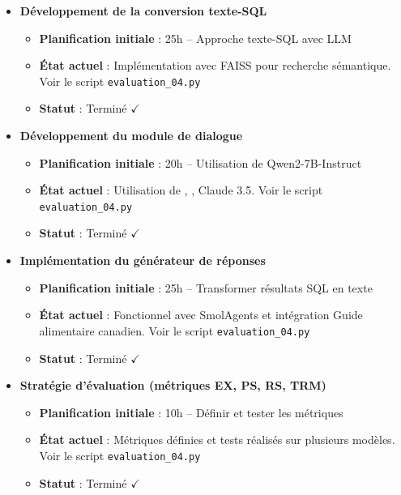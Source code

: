 \documentclass[a4paper,11pt]{article}
\begin{document}
\begin{itemize}
    \item \textbf{Développement de la conversion texte-SQL}
    \begin{itemize}
        \item \textbf{Planification initiale} : 25h -- Approche texte-SQL avec LLM
        \item \textbf{État actuel} : Implémentation avec FAISS pour recherche sémantique. Voir le script \texttt{evaluation\_04.py}
        \item \textbf{Statut} : Terminé $\checkmark$
    \end{itemize}
    
    \item \textbf{Développement du module de dialogue}
    \begin{itemize}
        \item \textbf{Planification initiale} : 20h -- Utilisation de Qwen2-7B-Instruct
        \item \textbf{État actuel} : Utilisation de , , Claude 3.5. Voir le script \texttt{evaluation\_04.py}
        \item \textbf{Statut} : Terminé $\checkmark$
    \end{itemize}
    
    \item \textbf{Implémentation du générateur de réponses}
    \begin{itemize}
        \item \textbf{Planification initiale} : 25h -- Transformer résultats SQL en texte
        \item \textbf{État actuel} : Fonctionnel avec SmolAgents et intégration Guide alimentaire canadien. Voir le script \texttt{evaluation\_04.py}
        \item \textbf{Statut} : Terminé $\checkmark$
    \end{itemize}
    
    \item \textbf{Stratégie d'évaluation (métriques EX, PS, RS, TRM)}
    \begin{itemize}
        \item \textbf{Planification initiale} : 10h -- Définir et tester les métriques
        \item \textbf{État actuel} : Métriques définies et tests réalisés sur plusieurs modèles. Voir le script \texttt{evaluation\_04.py}
        \item \textbf{Statut} : Terminé $\checkmark$
    \end{itemize}
    

\end{itemize}
\end{document}
